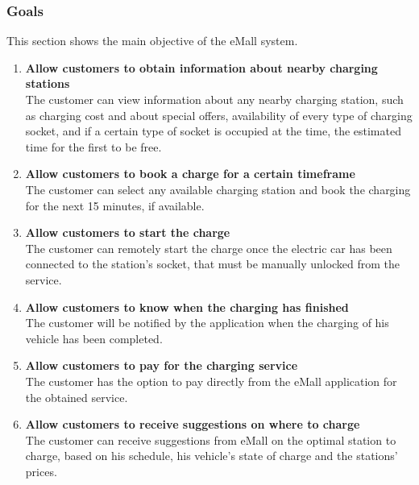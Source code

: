 \subsubsection{Goals} \label{goals}
This section shows the main objective of the eMall system.
\begin{enumerate}[label=$\bullet$ \textbf{G\arabic*:}]
        \item \textbf{Allow customers to obtain information about nearby charging stations}
        \\
        The customer can view information about any nearby charging station,  
        such as charging cost and about special offers, availability of every type of charging socket, 
        and if a certain type of socket is occupied at the time,
         the estimated time for the first to be free.
        \item \textbf{Allow customers to book a charge for a certain timeframe}
        \\
        The customer can select any available charging station and book the charging for the next 15 minutes, if available. 
        \item \textbf{Allow customers to start the charge}
        \\
        The customer can remotely start the charge once the electric car has been connected to the station's socket, that must be manually unlocked from the service.
        \item \textbf{Allow customers to know when the charging has finished}
        \\
        The customer will be notified by the application when the charging of his vehicle has been completed.
        \item \textbf{Allow customers to pay for the charging service}
        \\
        The customer has the option to pay directly from the eMall application for the obtained service.
        \item \textbf{Allow customers to receive suggestions on where to charge}
        \\
        The customer can receive suggestions from eMall on the optimal station to charge, based on his schedule, his vehicle's state of charge and the stations' prices.
        

\end{enumerate}
